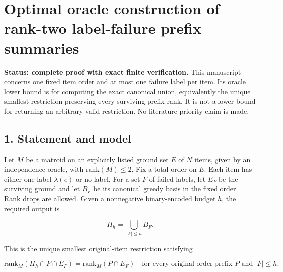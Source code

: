 
\hypertarget{af-b41875cb6e-optimal-oracle-construction-of-rank-two-label-failure-prefix-summaries}{%
\section{Optimal oracle construction of rank-two label-failure prefix summaries}\label{af-b41875cb6e-optimal-oracle-construction-of-rank-two-label-failure-prefix-summaries}}

\textbf{Status: complete proof with exact finite verification.} This manuscript concerns one fixed item order and at most one failure label per item. Its oracle lower bound is for computing the exact canonical union, equivalently the unique smallest restriction preserving every surviving prefix rank. It is not a lower bound for returning an arbitrary valid restriction. No literature-priority claim is made.

\hypertarget{af-b41875cb6e-statement-and-model}{%
\subsection{1. Statement and model}\label{af-b41875cb6e-statement-and-model}}

Let \(M\) be a matroid on an explicitly listed ground set \(E\) of \(N\) items, given by an independence oracle, with \(\mathrm{rank}(M)\le2\). Fix a total order on \(E\). Each item has either one label \(\lambda(e)\) or no label. For a set \(F\) of failed labels, let \(E_F\) be the surviving ground and let \(B_F\) be its canonical greedy basis in the fixed order. Rank drops are allowed. Given a nonnegative binary-encoded budget \(h\), the required output is

\[
H_h=\bigcup_{|F|\le h}B_F.
\tag{1}
\]

This is the unique smallest original-item restriction satisfying

\[
\mathrm{rank}_M(H_h\cap P\cap E_F)
=\mathrm{rank}_M(P\cap E_F)
\quad\text{for every original-order prefix }P\text{ and }|F|\le h.
\tag{2}
\]

